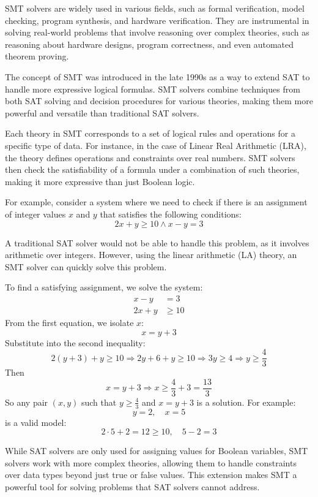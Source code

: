 SMT solvers are widely used in various fields, such as formal verification, model checking, program synthesis, and hardware verification. They are instrumental in solving real-world problems that involve reasoning over complex theories, such as reasoning about hardware designs, program correctness, and even automated theorem proving.

The concept of SMT was introduced in the late 1990s as a way to extend SAT to handle more expressive logical formulas. SMT solvers combine techniques from both SAT solving and decision procedures for various theories, making them more powerful and versatile than traditional SAT solvers.

Each theory in SMT corresponds to a set of logical rules and operations for a specific type of data. For instance, in the case of Linear Real Arithmetic (LRA), the theory defines operations and constraints over real numbers. SMT solvers then check the satisfiability of a formula under a combination of such theories, making it more expressive than just Boolean logic.

For example, consider a system where we need to check if there is an assignment of integer values $x$ and $y$ that satisfies the following conditions:
\begin{equation*}
    2x + y \geq 10 \land x - y = 3
\end{equation*}

A traditional SAT solver would not be able to handle this problem, as it involves arithmetic over integers. However, using the linear arithmetic (LA) theory, an SMT solver can quickly solve this problem.


To find a satisfying assignment, we solve the system:
\begin{align*}
x - y &= 3 \\
2x + y &\ge 10
\end{align*}
From the first equation, we isolate \( x \):
\[
x = y + 3
\]
Substitute into the second inequality:
\[
2(y + 3) + y \ge 10 \Rightarrow 2y + 6 + y \ge 10 \Rightarrow 3y \ge 4 \Rightarrow y \ge \frac{4}{3}
\]
Then 
\[ x = y + 3 \Rightarrow x \ge \frac{4}{3} + 3 = \frac{13}{3} \]
So any pair \( (x, y) \) such that \( y \ge \frac{4}{3} \) and \( x = y + 3 \) is a solution. For example:
\[
y = 2,\quad x = 5
\]
is a valid model:
\[
2 \cdot 5 + 2 = 12 \ge 10,\quad 5 - 2 = 3
\]


While SAT solvers are only used for assigning values for Boolean variables, SMT solvers work with more complex theories, allowing them to handle constraints over data types beyond just true or false values. This extension makes SMT a powerful tool for solving problems that SAT solvers cannot address.

